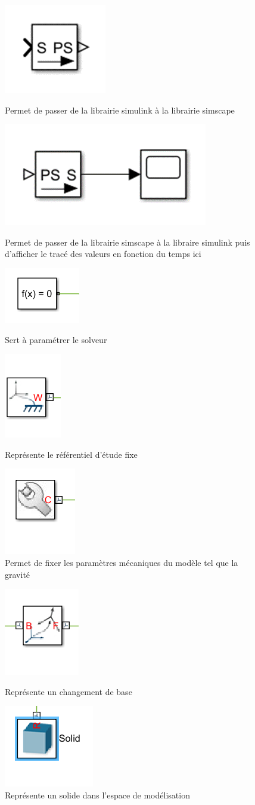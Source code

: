 \documentclass[12pt,a4paper]{article}
\begin{document}
\begin{figure}[h!]
\centering
\includegraphics[width=.15\linewidth]{s_ps.png}
\caption{Permet de passer de la librairie simulink à la librairie simscape}
\includegraphics[width=.3\linewidth]{ps_s.png}
\caption{Permet de passer de la librairie simscape à la libraire simulink puis d’afficher le tracé des valeurs en fonction du temps ici}
\includegraphics[width=.2\linewidth]{solveur.png}
\caption{Sert à paramétrer le solveur}
\includegraphics[width=.15\linewidth]{repere.png}
\caption{Représente le référentiel d’étude fixe}
\includegraphics[width=.15\linewidth]{param.png}
\caption{Permet de fixer les paramètres mécaniques du modèle tel que la gravité}
\end{figure}
\begin{figure}[h!]
\centering
\includegraphics[width=.15\linewidth]{changement.png}
\caption{Représente un changement de base}
\includegraphics[width=.15\linewidth]{solid.png}
\caption{Représente un solide dans l’espace de modélisation}
\end{figure}
\newpage
\end{document}
